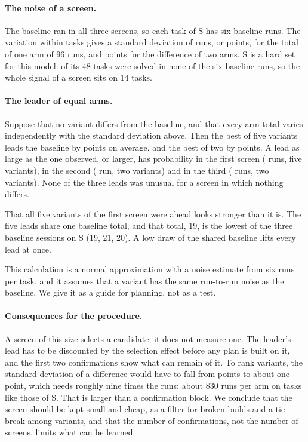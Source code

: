 \paragraph{The noise of a screen.}
The baseline ran in all three screens, so each task of S has six baseline runs. The variation within tasks gives a
standard deviation of \ScreenSdArmRuns{} runs, or \ScreenSdArmPts{} points, for the total of one arm of 96 runs, and
\ScreenSdDiffPts{} points for the difference of two arms. S is a hard set for this model: \SNeverBase{} of its 48
tasks were solved in none of the six baseline runs, so the whole signal of a screen sits on 14 tasks.

\paragraph{The leader of equal arms.}
Suppose that no variant differs from the baseline, and that every arm total varies independently with the standard
deviation above. Then the best of five variants leads the baseline by \ScreenNullLeadFive{} points on average, and the
best of two by \ScreenNullLeadTwo{} points. A lead as large as the one observed, or larger, has probability
\ScreenNullPOne{} in the first screen (\ScreenLeadRunsOne{} runs, five variants), \ScreenNullPTwo{} in the second
(\ScreenLeadRunsTwo{} run, two variants) and \ScreenNullPThree{} in the third (\ScreenLeadRunsThree{} runs, two
variants). None of the three leads was unusual for a screen in which nothing differs.

That all five variants of the first screen were ahead looks stronger than it is. The five leads share one baseline
total, and that total, 19, is the lowest of the three baseline sessions on S (19, 21, 20). A low draw of the shared
baseline lifts every lead at once.

This calculation is a normal approximation with a noise estimate from six runs per task, and it assumes that a
variant has the same run-to-run noise as the baseline. We give it as a guide for planning, not as a test.

\paragraph{Consequences for the procedure.}
A screen of this size selects a candidate; it does not measure one. The leader's lead has to be discounted by the
selection effect before any plan is built on it, and the first two confirmations show what can remain of it. To rank
variants, the standard deviation of a difference would have to fall from \ScreenSdDiffPts{} points to about one
point, which needs roughly nine times the runs: about 830 runs per arm on tasks like those of S. That is larger than
a confirmation block. We conclude that the screen should be kept small and cheap, as a filter for broken builds and
a tie-break among variants, and that the number of confirmations, not the number of screens, limits what can be
learned.


